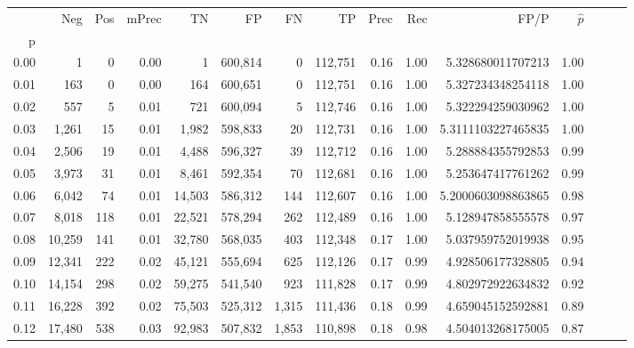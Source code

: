 \begin{tabular}{rrrrrrrrrrrrrrr}
\toprule
{} &     Neg &    Pos & mPrec &       TN &       FP &       FN &       TP &  Prec &   Rec &                    FP/P & $\hat{p}$ \\
p    &         &        &       &          &          &          &          &       &       &                         &           \\
\midrule
0.00 &       1 &      0 &  0.00 &        1 &  600,814 &        0 &  112,751 &  0.16 &  1.00 &       5.328680011707213 &      1.00 \\
0.01 &     163 &      0 &  0.00 &      164 &  600,651 &        0 &  112,751 &  0.16 &  1.00 &       5.327234348254118 &      1.00 \\
0.02 &     557 &      5 &  0.01 &      721 &  600,094 &        5 &  112,746 &  0.16 &  1.00 &       5.322294259030962 &      1.00 \\
0.03 &   1,261 &     15 &  0.01 &    1,982 &  598,833 &       20 &  112,731 &  0.16 &  1.00 &      5.3111103227465835 &      1.00 \\
0.04 &   2,506 &     19 &  0.01 &    4,488 &  596,327 &       39 &  112,712 &  0.16 &  1.00 &       5.288884355792853 &      0.99 \\
0.05 &   3,973 &     31 &  0.01 &    8,461 &  592,354 &       70 &  112,681 &  0.16 &  1.00 &       5.253647417761262 &      0.99 \\
0.06 &   6,042 &     74 &  0.01 &   14,503 &  586,312 &      144 &  112,607 &  0.16 &  1.00 &      5.2000603098863865 &      0.98 \\
0.07 &   8,018 &    118 &  0.01 &   22,521 &  578,294 &      262 &  112,489 &  0.16 &  1.00 &       5.128947858555578 &      0.97 \\
0.08 &  10,259 &    141 &  0.01 &   32,780 &  568,035 &      403 &  112,348 &  0.17 &  1.00 &       5.037959752019938 &      0.95 \\
0.09 &  12,341 &    222 &  0.02 &   45,121 &  555,694 &      625 &  112,126 &  0.17 &  0.99 &       4.928506177328805 &      0.94 \\
0.10 &  14,154 &    298 &  0.02 &   59,275 &  541,540 &      923 &  111,828 &  0.17 &  0.99 &       4.802972922634832 &      0.92 \\
0.11 &  16,228 &    392 &  0.02 &   75,503 &  525,312 &    1,315 &  111,436 &  0.18 &  0.99 &       4.659045152592881 &      0.89 \\
0.12 &  17,480 &    538 &  0.03 &   92,983 &  507,832 &    1,853 &  110,898 &  0.18 &  0.98 &       4.504013268175005 &      0.87 \\

\end{tabular}
